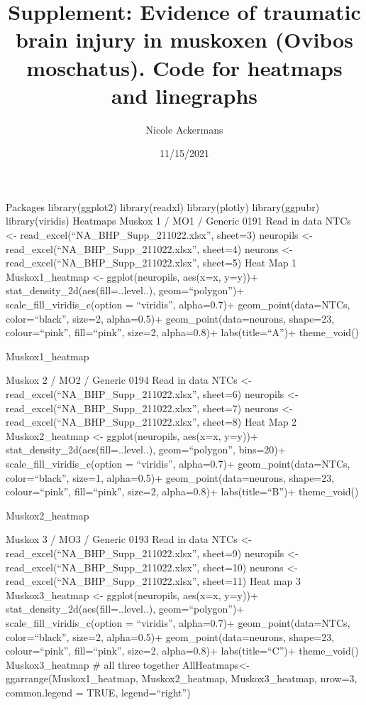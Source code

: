 \documentclass[
]{article}
\title{Supplement: Evidence of traumatic brain injury in muskoxen
(Ovibos moschatus). Code for heatmaps and linegraphs}
\author{Nicole Ackermans}
\date{11/15/2021}
\begin{document}
\maketitle

Packages library(ggplot2) library(readxl) library(plotly)
library(ggpubr) library(viridis) Heatmaps Muskox 1 / MO1 / Generic 0191
Read in data NTCs \textless- read\_excel(``NA\_BHP\_Supp\_211022.xlsx'',
sheet=3) neuropils \textless-
read\_excel(``NA\_BHP\_Supp\_211022.xlsx'', sheet=4) neurons \textless-
read\_excel(``NA\_BHP\_Supp\_211022.xlsx'', sheet=5) Heat Map 1
Muskox1\_heatmap \textless- ggplot(neuropils, aes(x=x, y=y))+
stat\_density\_2d(aes(fill=..level..), geom=``polygon'')+
scale\_fill\_viridis\_c(option = ``viridis'', alpha=0.7)+
geom\_point(data=NTCs, color=``black'', size=2, alpha=0.5)+
geom\_point(data=neurons, shape=23, colour=``pink'', fill=``pink'',
size=2, alpha=0.8)+ labs(title=``A'')+ theme\_void()

Muskox1\_heatmap

Muskox 2 / MO2 / Generic 0194 Read in data NTCs \textless-
read\_excel(``NA\_BHP\_Supp\_211022.xlsx'', sheet=6) neuropils
\textless- read\_excel(``NA\_BHP\_Supp\_211022.xlsx'', sheet=7) neurons
\textless- read\_excel(``NA\_BHP\_Supp\_211022.xlsx'', sheet=8) Heat Map
2 Muskox2\_heatmap \textless- ggplot(neuropils, aes(x=x, y=y))+
stat\_density\_2d(aes(fill=..level..), geom=``polygon'', bins=20)+
scale\_fill\_viridis\_c(option = ``viridis'', alpha=0.7)+
geom\_point(data=NTCs, color=``black'', size=1, alpha=0.5)+
geom\_point(data=neurons, shape=23, colour=``pink'', fill=``pink'',
size=2, alpha=0.8)+ labs(title=``B'')+ theme\_void()

Muskox2\_heatmap

Muskox 3 / MO3 / Generic 0193 Read in data NTCs \textless-
read\_excel(``NA\_BHP\_Supp\_211022.xlsx'', sheet=9) neuropils
\textless- read\_excel(``NA\_BHP\_Supp\_211022.xlsx'', sheet=10) neurons
\textless- read\_excel(``NA\_BHP\_Supp\_211022.xlsx'', sheet=11) Heat
map 3 Muskox3\_heatmap \textless- ggplot(neuropils, aes(x=x, y=y))+
stat\_density\_2d(aes(fill=..level..), geom=``polygon'')+
scale\_fill\_viridis\_c(option = ``viridis'', alpha=0.7)+
geom\_point(data=NTCs, color=``black'', size=2, alpha=0.5)+
geom\_point(data=neurons, shape=23, colour=``pink'', fill=``pink'',
size=2, alpha=0.8)+ labs(title=``C'')+ theme\_void() Muskox3\_heatmap \#
all three together AllHeatmaps\textless-ggarrange(Muskox1\_heatmap,
Muskox2\_heatmap, Muskox3\_heatmap, nrow=3, common.legend = TRUE,
legend=``right'')
\end{document}
